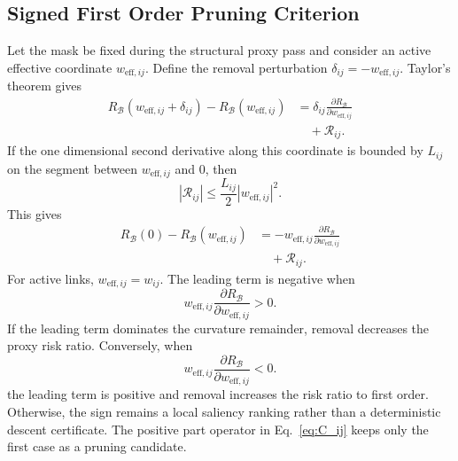 \documentclass[letterpaper]{article}
\begin{document}
\subsection{Signed First Order Pruning Criterion}
\label{app:signed_pruning}
Let the mask be fixed during the structural proxy pass and consider an active effective coordinate $w_{\text{eff},ij}$. Define the removal perturbation $\delta_{ij}=-w_{\text{eff},ij}$. Taylor's theorem gives
\begin{equation}
\begin{aligned}
    R_{\mathcal B}(w_{\mathrm{eff},ij}+\delta_{ij})
    -R_{\mathcal B}(w_{\mathrm{eff},ij})
    &=\delta_{ij}\frac{\partial R_{\mathcal B}}
    {\partial w_{\mathrm{eff},ij}}\\
    &\quad+\mathcal R_{ij}.
\end{aligned}
\end{equation}
If the one dimensional second derivative along this coordinate is bounded by $L_{ij}$ on the segment between $w_{\text{eff},ij}$ and $0$, then
\[
    |\mathcal{R}_{ij}|
    \le
    \frac{L_{ij}}{2}|w_{\text{eff},ij}|^2.
\]
This gives
\begin{equation*}
\begin{aligned}
    R_{\mathcal B}(0)-R_{\mathcal B}(w_{\mathrm{eff},ij})
    &=-w_{\mathrm{eff},ij}\frac{\partial R_{\mathcal B}}
    {\partial w_{\mathrm{eff},ij}}\\
    &\quad+\mathcal R_{ij}.
\end{aligned}
\end{equation*}
For active links, $w_{\text{eff},ij}=w_{ij}$. The leading term is negative when
\begin{equation}\label{eq:proof_signed_positive}
    w_{\mathrm{eff},ij}
    \frac{\partial R_{\mathcal B}}{\partial w_{\mathrm{eff},ij}}>0.
\end{equation}
If the leading term dominates the curvature remainder, removal decreases the proxy risk ratio. Conversely, when
\begin{equation}\label{eq:proof_signed_negative}
    w_{\mathrm{eff},ij}
    \frac{\partial R_{\mathcal B}}{\partial w_{\mathrm{eff},ij}}<0.
\end{equation}
the leading term is positive and removal increases the risk ratio to first order. Otherwise, the sign remains a local saliency ranking rather than a deterministic descent certificate. The positive part operator in Eq.~\ref{eq:C_ij} keeps only the first case as a pruning candidate.
\end{document}
